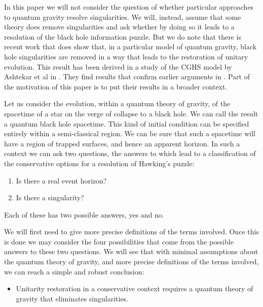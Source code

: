 \documentclass[12pt]{article}
\begin{document}
In this paper we will not consider the question of whether particular approaches to quantum gravity resolve singularities.  We will, instead, assume that some theory does remove singularities and ask whether by doing so it leads to a resolution of the black hole information puzzle.  But we do note that there is recent work that does show that, in a particular model of quantum gravity, black hole singularities are removed in a way that leads to the restoration of unitary evolution.  This result has been derived in a study of the CGHS \cite{CGHS} model by Ashtekar et al in \cite{Ashtekar:2008jd}.  They find results that confirm earlier arguments in \cite{Abhay-Martin}.  
Part of the motivation of this paper is to put their results in a broader context. 

   Let us consider the evolution, within a quantum theory of gravity, of the spacetime of a star on the verge of
collapse to a black hole.  We can call the result a quantum black hole spacetime.  This kind of initial condition can be specified entirely within a semi-classical region.  We can be sure that such a spacetime will have a region of trapped surfaces, and hence an apparent horizon.   In such a context we can ask two questions, the answers to which lead to a classification of the conservative options for a resolution of Hawking's puzzle:

\begin{enumerate}

\item{} Is there a real event horizon?

\item{} Is there a singularity?

\end{enumerate}

Each of these has two possible answers, yes and no.  

We will first need to give more precise definitions of the terms involved. Once this is done we may consider the four possibilities that come from the possible answers to these two questions.  We will see that with minimal assumptions about the quantum theory of gravity, and more precise definitions of the terms involved, we can reach a simple and robust conclusion:

\begin{itemize}

\item{} Unitarity restoration in a conservative context requires a quantum theory of gravity that eliminates singularities. 

\end{itemize}
\end{document}
